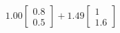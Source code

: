 \documentclass[preview]{standalone}
\begin{document}
\begin{align*}
1.00 \begin{bmatrix} 0.8 \\ 0.5 \end{bmatrix} + 1.49 \begin{bmatrix} 1 \\ 1.6 \end{bmatrix}
\end{align*}
\end{document}
